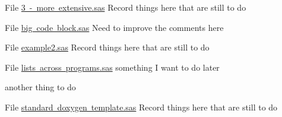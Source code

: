 
\begin{DoxyRefList}
\item[File \mbox{\hyperlink{3_01-_01more_01extensive_8sas}{3 -\/ more extensive.sas}} ]\label{todo__todo000001}%
%
Record things here that are still to do 


\item[File \mbox{\hyperlink{big_01code_01block_8sas}{big code block.sas}} ]\label{todo__todo000002}%
%
Need to improve the comments here 


\item[File \mbox{\hyperlink{example2_8sas}{example2.sas}} ]\label{todo__todo000003}%
%
Record things here that are still to do 


\item[File \mbox{\hyperlink{lists_01across_01programs_8sas}{lists across programs.sas}} ]\label{todo__todo000004}%
%
something I want to do later 



another thing to do 
\item[File \mbox{\hyperlink{standard_01doxygen_01template_8sas}{standard doxygen template.sas}} ]\label{todo__todo000005}%
%
Record things here that are still to do 


\end{DoxyRefList}